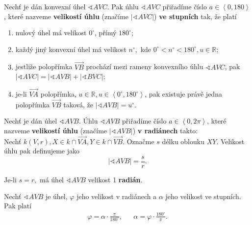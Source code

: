 \begin{definition}\label{uhelvel}
  Nechť je dán konvexní úhel $\sphericalangle AVC$. Pak úhlu $\sphericalangle AVC$ přiřadíme číslo $a \in \left<  0, 180 \right>$, které nazveme \textbf{velikostí úhlu} (značíme $|\sphericalangle AVC|$) \textbf{ve stupních} tak, že platí
  \begin{enumerate}[$i.$]
    \item nulový úhel má velikost $0^\circ$, přímý $180^\circ$;
    \item každý jiný konvexní úhel má velikost $n^\circ, $ kde $0^\circ< n ^\circ< 180^\circ, u \in \mathbb R;$
    \item jestliže polopřímka $\overrightarrow{VB}$ prochází mezi rameny konvexního úhlu $\sphericalangle AVC$, pak $|\sphericalangle AVC|=|\sphericalangle AVB|+ |\sphericalangle BVC|$;
    \item je-li $\overrightarrow{VA}$ polopřímka, $u \in \mathbb R, u \in \left<  0 ^\circ,180^\circ \right>$, pak existuje právě jedna polopřímka $\overrightarrow{VB}$ taková, že $|\sphericalangle AVB|=u^\circ.$
  \end{enumerate}
\end{definition}

\begin{definition}\label{raddef}
    Nechť je dán úhel $\sphericalangle AVB$. Úhlu $\sphericalangle AVB$ přiřadíme číslo $a\in \left<  0, 2\pi \right>$,
    které nazveme \textbf{velikostí úhlu} (značíme $|\sphericalangle AVB|$) \textbf{v radiánech} takto:\\
    Nechť $k(V,r), X\in k\cap \overrightarrow{VA}, Y\in k\cap \overrightarrow{VB}.$
    Označme $s$ délku oblouku $XY.$ Velikost úhlu pak definujeme jako
    $$|\sphericalangle AVB| = \frac{s}{r}.$$
\end{definition}

\begin{pozn}
    Je-li $s=r,$ má úhel $\sphericalangle AVB$ velikost 1 \textbf{radián}.
\end{pozn}

\begin{veta}
    Nechť $\sphericalangle AVB$ je úhel, $\varphi$ jeho velikost v radiánech a $\alpha$
    jeho velikost ve stupních. Pak platí
    \begin{align*}
        \varphi = \alpha\cdot \frac{\pi}{180^\circ}, & & \alpha = \varphi\cdot \frac{180^\circ}{\pi}.
    \end{align*}
\end{veta}

